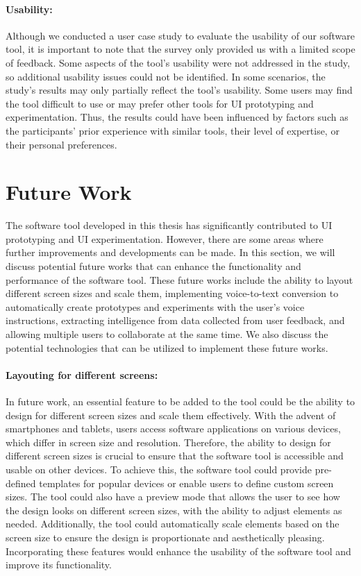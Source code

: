 \paragraph{Usability:}
Although we conducted a user case study to evaluate the usability of our software tool, it is important to note that the survey only provided us with a limited scope of feedback. 
Some aspects of the tool's usability were not addressed in the study, so additional usability issues could not be identified.
In some scenarios, the study's results may only partially reflect the tool's usability.
Some users may find the tool difficult to use or may prefer other tools for UI prototyping and experimentation.
Thus, the results could have been influenced by factors such as the participants' prior experience with similar tools, their level of expertise, or their personal preferences.

\clearpage
\section{Future Work}
\label{section:conclusion:futurework}
The software tool developed in this thesis has significantly contributed to UI prototyping and UI experimentation. 
However, there are some areas where further improvements and developments can be made. 
In this section, we will discuss potential future works that can enhance the functionality and performance of the software tool. 
These future works include the ability to layout different screen sizes and scale them, implementing voice-to-text conversion to automatically create prototypes and experiments with the user's voice instructions, extracting intelligence from data collected from user feedback, and allowing multiple users to collaborate at the same time. 
We also discuss the potential technologies that can be utilized to implement these future works.

\paragraph{Layouting for different screens:}
In future work, an essential feature to be added to the tool could be the ability to design for different screen sizes and scale them effectively. 
With the advent of smartphones and tablets, users access software applications on various devices, which differ in screen size and resolution. 
Therefore, the ability to design for different screen sizes is crucial to ensure that the software tool is accessible and usable on other devices.
To achieve this, the software tool could provide pre-defined templates for popular devices or enable users to define custom screen sizes. 
The tool could also have a preview mode that allows the user to see how the design looks on different screen sizes, with the ability to adjust elements as needed. 
Additionally, the tool could automatically scale elements based on the screen size to ensure the design is proportionate and aesthetically pleasing. 
Incorporating these features would enhance the usability of the software tool and improve its functionality.

